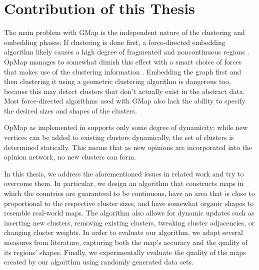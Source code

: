 \section{Contribution of this Thesis}
\label{sect:structure-of-this-thesis}

The main problem with GMap is the independent nature of the clustering and embedding phases:
If clustering is done first, a force-directed embedding algorithm likely causes a high degree of fragmented and noncontinuous regions \cite{mashima2011visualizing}.
OpMap manages to somewhat dimish this effect with a smart choice of forces that makes use of the clustering information \cite{schmettow2017}.
Embedding the graph first and then clustering it using a geometric clustering algorithm is dangerous too, because this may detect clusters that don't actually exist in the abstract data.
Most force-directed algorithms used with GMap also lack the ability to specify the desired sizes and shapes of the clusters.

OpMap as implemented in \cite{schmettow2017} supports only some degree of dynamicity: while new vertices can be added to existing clusters dynamically, the set of clusters is determined statically.
This means that as new opinions are incorporated into the opinion network, no new clusters can form.

In this thesis, we address the aforementioned issues in related work and try to overcome them.
In particular, we design an algorithm that constructs maps in which the countries are guaranteed to be continuous, have an area that is close to proportional to the respective cluster sizes, and have somewhat organic shapes to resemble real-world maps.
The algorithm also allows for dynamic updates such as inserting new clusters, removing existing clusters, tweaking cluster adjacencies, or changing cluster weights.
In order to evaluate our algorithm, we adapt several measures from literature, capturing both the map's accuracy and the quality of its regions' shapes.
Finally, we experimentally evaluate the quality of the maps created by our algorithm using randomly generated data sets.
